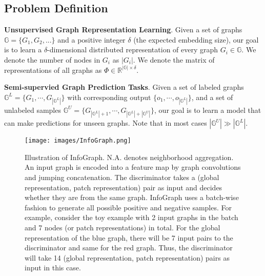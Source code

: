 \documentclass{article} \usepackage{iclr2020_conference,times}
\newcommand{\xhdr}[1]{{\noindent\bfseries #1}.}
\def\method{InfoGraph}
\begin{document}
\subsection{Problem Definition}

\xhdr{Unsupervised Graph Representation Learning} 
Given a set of graphs $\mathbb{G} = \{G_1, G_2,...\}$ and a positive integer $\delta$ (the expected embedding size), our goal is to learn a $\delta$-dimensional distributed representation of every graph $ G_i \in \mathbb{G} $. We denote the number of nodes in $G_i$ as $\left| G_i \right|$. We denote the matrix of representations of all graphs as $ \Phi \in \mathbb{R}^{|\mathbb{G}| \times \delta} $.

\xhdr{Semi-supervied Graph Prediction Tasks} Given a set of labeled graphs $\mathbb{G}^{L}=\{G_{1}, \cdots , G_{|\mathbb{G}^{L}|}\}$ with corresponding output $\{o_{1}, \cdots ,o_{|\mathbb{G}^{L}|}\}$, and a set of unlabeled samples $\mathbb{G}^{U}= \{ G_{|\mathbb{G}^{L}| + 1}, \cdots, G_{|\mathbb{G}^{L}| + |\mathbb{G}^{U}|} \}$, our goal is to learn a model that can make predictions for unseen graphs. Note that in most cases $|\mathbb{G}^{U}| \gg |\mathbb{G}^{L}|$.








 














\begin{figure}[t]
    \centering
    \texttt{[image: images/InfoGraph.png]}
    \caption{Illustration of \method{}. N.A. denotes neighborhood aggregation. An input graph is encoded into a feature map by graph convolutions and jumping concatenation. The discriminator takes a (global representation, patch representation) pair as input and decides whether they are from the same graph. \method{} uses a batch-wise fashion to generate all possible positive and negative samples. For example, consider the toy example with 2 input graphs in the batch and 7 nodes (or patch representations) in total. For the global representation of the blue graph, there will be 7 input pairs to the discriminator and same for the red graph. Thus, the discriminator will take 14 (global representation, patch representation) pairs as input in this case.}
    \label{fig:gnn-infomax}
\end{figure}
\end{document}
